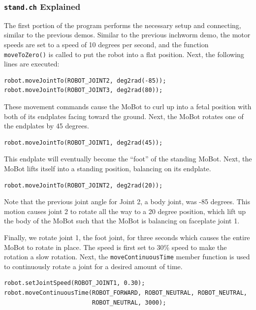 \documentclass{article}
\begin{document}
\subsubsection{\texttt{stand.ch} Explained}
The first portion of the program performs the necessary setup and connecting,
similar to the previous demos. Similar to the previous inchworm demo, the
motor speeds are set to a speed of 10 degrees per second, and the function \texttt{moveToZero()} is
called to put the robot into a flat position. Next, the following lines
are executed:
\begin{verbatim}
robot.moveJointTo(ROBOT_JOINT2, deg2rad(-85));
robot.moveJointTo(ROBOT_JOINT3, deg2rad(80));
\end{verbatim}
These movement commands cause the MoBot to curl up into a fetal position with
both of its endplates facing toward the ground. Next, the MoBot rotates one 
of the endplates by 45 degrees. 
\begin{verbatim}
robot.moveJointTo(ROBOT_JOINT1, deg2rad(45));
\end{verbatim}
This endplate will eventually become the ``foot'' of the standing MoBot. Next,
the MoBot lifts itself into a standing position, balancing on its endplate.
\begin{verbatim}
robot.moveJointTo(ROBOT_JOINT2, deg2rad(20));
\end{verbatim}
Note that the previous joint angle for Joint 2, a body joint, was -85 degrees. 
This motion causes joint 2 to rotate all the way to a 20 degree position, which
lift up the body of the MoBot such that the MoBot is balancing on faceplate joint 1.

Finally, we rotate joint 1, the foot joint, for three seconds which causes the
entire MoBot to rotate in place. The speed is first set to 30\% speed to make the
rotation a slow rotation. Next, the \texttt{moveContinuousTime} member function
is used to continuously rotate a joint for a desired amount of time.
\begin{verbatim}
robot.setJointSpeed(ROBOT_JOINT1, 0.30);
robot.moveContinuousTime(ROBOT_FORWARD, ROBOT_NEUTRAL, ROBOT_NEUTRAL, 
                         ROBOT_NEUTRAL, 3000);
\end{verbatim}
\end{document}
